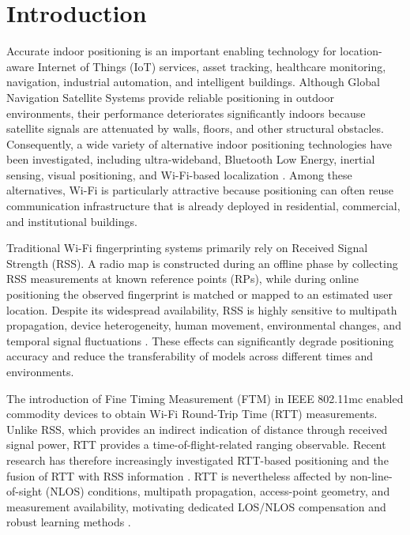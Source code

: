 \section{Introduction}

Accurate indoor positioning is an important enabling technology for location-aware Internet of Things (IoT) services, asset tracking, healthcare monitoring, navigation, industrial automation, and intelligent buildings. Although Global Navigation Satellite Systems provide reliable positioning in outdoor environments, their performance deteriorates significantly indoors because satellite signals are attenuated by walls, floors, and other structural obstacles. Consequently, a wide variety of alternative indoor positioning technologies have been investigated, including ultra-wideband, Bluetooth Low Energy, inertial sensing, visual positioning, and Wi-Fi-based localization \cite{qiao2024survey,dai2023survey}. Among these alternatives, Wi-Fi is particularly attractive because positioning can often reuse communication infrastructure that is already deployed in residential, commercial, and institutional buildings.

Traditional Wi-Fi fingerprinting systems primarily rely on Received Signal Strength (RSS). A radio map is constructed during an offline phase by collecting RSS measurements at known reference points (RPs), while during online positioning the observed fingerprint is matched or mapped to an estimated user location. Despite its widespread availability, RSS is highly sensitive to multipath propagation, device heterogeneity, human movement, environmental changes, and temporal signal fluctuations \cite{shang2022overview,feng2022deep}. These effects can significantly degrade positioning accuracy and reduce the transferability of models across different times and environments.

The introduction of Fine Timing Measurement (FTM) in IEEE 802.11mc enabled commodity devices to obtain Wi-Fi Round-Trip Time (RTT) measurements. Unlike RSS, which provides an indirect indication of distance through received signal power, RTT provides a time-of-flight-related ranging observable. Recent research has therefore increasingly investigated RTT-based positioning and the fusion of RTT with RSS information \cite{martinescalona2023ftm,eberechukwu2023fusion,feng2023rttfingerprinting,dong2023rtt_rss}. RTT is nevertheless affected by non-line-of-sight (NLOS) conditions, multipath propagation, access-point geometry, and measurement availability, motivating dedicated LOS/NLOS compensation and robust learning methods \cite{cao2024los,lyu2025visibility}.

